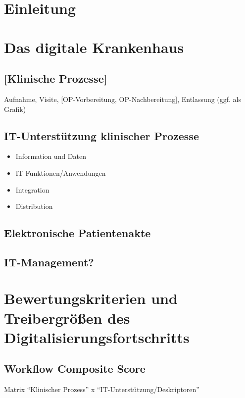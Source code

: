
{}
\section{Einleitung}
\section{Das digitale Krankenhaus}
	\subsection{[Klinische Prozesse]}
		Aufnahme, Visite, [OP-Vorbereitung, OP-Nachbereitung], Entlassung (ggf. als Grafik)
	\subsection{IT-Unterstützung klinischer Prozesse}
		\parencite[37]{huebner2019}
	\begin{itemize} 
		\item Information und Daten
		\item IT-Funktionen/Anwendungen{}
		\item Integration
		\item Distribution
	\end{itemize}
	\subsection{ Elektronische Patientenakte}
	\subsection{IT-Management?}
\section{Bewertungskriterien und Treibergrößen des Digitalisierungsfortschritts}
	\subsection{Workflow Composite Score}
		Matrix “Klinischer Prozess” x “IT-Unterstützung/Deskriptoren”
